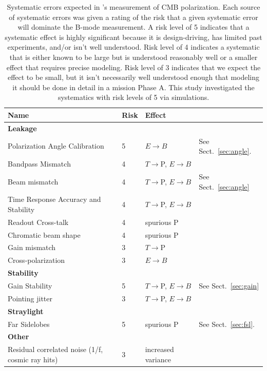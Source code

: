 \documentclass[PICOReport.tex]{subfiles}
\begin{document}
\begin{table}[h!]
\hspace{-0.1in}
\parbox{3.4in}{
\centering
\scriptsize
 \begin{tabular}{p{3.3cm} p{0.5cm} p{1.4cm} p{1.7cm}}
 \hline
\textbf{Name} & \textbf{Risk}&\textbf{Effect} \\
 \hline
\textbf{Leakage}& &\\
Polarization Angle Calibration\dotfill& 
5&
$E{\to}B$ &
See Sect.~\ref{sec:angle}.
\\
 Bandpass Mismatch\dotfill&
 4& 
$T{\to}$P, $E{\to}B$  
   \\
Beam mismatch\dotfill& 
4&
$T{\to}$P, $E{\to}B$
& See Sect.~\ref{sec:angle}
\\
Time Response Accuracy and Stability\dotfill&
4&
$T{\to}$P, $E{\to}B$
\\
Readout Cross-talk\dotfill& 
4&
spurious P
\\
Chromatic beam shape\dotfill&
4&
spurious P
\\

Gain mismatch\dotfill&
3&
$T{\to}$P   
\\


Cross-polarization\dotfill&
3&
$E{\to}B$
\\
\hline 
\textbf{Stability} & & \\
Gain Stability\dotfill& 
5&
$T{\to}$P, $E{\to} B$
& 
See Sect.~\ref{sec:gain}
\\
Pointing jitter\dotfill&
3&
$T{\to}$P, $E{\to}B$
\\

\hline
\textbf{Straylight}& & \\
Far Sidelobes\dotfill& 
5&
spurious P
&
See Sect.~\ref{sec:fsl}.\\
 \hline
\textbf{Other} \\
Residual correlated noise (1/f, cosmic ray hits)\dotfill&
3 &
increased variance
\\
\hline
 \end{tabular}
}
\hspace{-0.0in}
\parbox{3.1in}{
\caption{\captiontext
Systematic errors expected in \pico's measurement of CMB polarization. Each source of systematic errors was given a rating of the risk that a given systematic error will dominate the B-mode measurement.  A risk level of 5 indicates that a systematic effect is highly significant because it is design-driving, has limited past experiments, and/or isn't well understood.  Risk level of 4 indicates a systematic that is either known to be large but is understood reasonably well or a smaller effect that requires precise modeling.  Risk level of 3 indicates that we expect the effect to be small, but it isn't necessarily well understood enough that modeling it should be done in detail in a mission Phase A. This study investigated the systematics with risk levels of 5 via simulations.
\label{tbl:SystematicsList2col} }}
\hspace{-0.0in}
\end{table}
\end{document}
